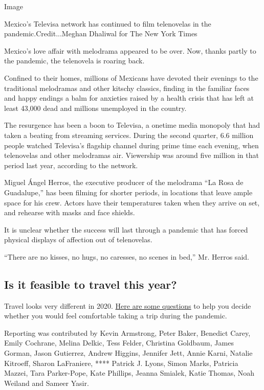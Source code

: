 Image

Mexico's Televisa network has continued to film telenovelas in the
pandemic.Credit...Meghan Dhaliwal for The New York Times

Mexico's love affair with melodrama appeared to be over. Now, thanks
partly to the pandemic, the telenovela is roaring back.

Confined to their homes, millions of Mexicans have devoted their
evenings to the traditional melodramas and other kitschy classics,
finding in the familiar faces and happy endings a balm for anxieties
raised by a health crisis that has left at least 43,000 dead and
millions unemployed in the country.

The resurgence has been a boon to Televisa, a onetime media monopoly
that had taken a beating from streaming services. During the second
quarter, 6.6 million people watched Televisa's flagship channel during
prime time each evening, when telenovelas and other melodramas air.
Viewership was around five million in that period last year, according
to the network.

Miguel Ángel Herros, the executive producer of the melodrama ``La Rosa
de Guadalupe,'' has been filming for shorter periods, in locations that
leave ample space for his crew. Actors have their temperatures taken
when they arrive on set, and rehearse with masks and face shields.

It is unclear whether the success will last through a pandemic that has
forced physical displays of affection out of telenovelas.

``There are no kisses, no hugs, no caresses, no scenes in bed,'' Mr.
Herros said.

\hypertarget{is-it-feasible-to-travel-this-year}{%
\subsection{Is it feasible to travel this
year?}\label{is-it-feasible-to-travel-this-year}}

Travel looks very different in 2020.
\href{https://www.nytimes3xbfgragh.onion/interactive/2020/07/31/travel/coronavirus-travel-risk.html}{Here
are some questions} to help you decide whether you would feel
comfortable taking a trip during the pandemic.

Reporting was contributed by Kevin Armstrong, Peter Baker, Benedict
Carey, Emily Cochrane, Melina Delkic, Tess Felder, Christina Goldbaum,
James Gorman, Jason Gutierrez, Andrew Higgins, Jennifer Jett, Annie
Karni, Natalie Kitroeff, Sharon LaFraniere, **** Patrick J. Lyons, Simon
Marks, Patricia Mazzei, Tara Parker-Pope, Kate Phillips, Jeanna Smialek,
Katie Thomas, Noah Weiland and Sameer Yasir.

